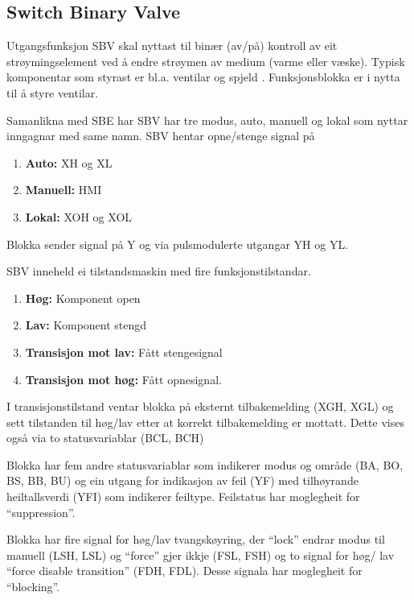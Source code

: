 \subsection{Switch Binary Valve}

Utgangsfunksjon \gls{SBV} skal nyttast til binær (av/på) kontroll av eit strøymingselement ved å endre strøymen av medium (varme eller væske). 
Typisk komponentar som styrast er bl.a. ventilar og spjeld \citep{IEC-63131}.
Funksjonsblokka er i nytta til å styre ventilar.

Samanlikna med \gls{SBE} har \gls{SBV} har tre modus, auto, manuell og lokal som nyttar inngagnar med same namn.
\gls{SBV} hentar opne/stenge signal på
\begin{enumerate}
    \item \textbf{Auto:}        XH og XL  
    \item \textbf{Manuell:}     HMI
    \item \textbf{Lokal:}       XOH og XOL
\end{enumerate}
Blokka sender signal på Y og via pulsmodulerte utgangar YH og YL.

\gls{SBV} inneheld ei tilstandsmaskin med fire funksjonstilstandar. 
\begin{enumerate}
    \item \textbf{Høg:}                 Komponent open
    \item \textbf{Lav:}                 Komponent stengd
    \item \textbf{Transisjon mot lav:}  Fått stengesignal
    \item \textbf{Transisjon mot høg:}  Fått opnesignal.
\end{enumerate}

I transisjonstilstand ventar blokka på eksternt tilbakemelding (XGH, XGL) 
og sett tilstanden til høg/lav etter at korrekt tilbakemelding er mottatt.
Dette vises også via to statusvariablar (BCL, BCH)

Blokka har fem andre statusvariablar som indikerer modus og område (BA, BO, BS, BB, BU) og
ein utgang for indikasjon av feil (YF) med tilhøyrande heiltallsverdi (YFI) som indikerer feiltype. \newline
Feilstatus har moglegheit for ``suppression''.

Blokka har fire signal for høg/lav tvangskøyring, der ``lock'' endrar modus til manuell (LSH, LSL) og ``force'' gjer ikkje (FSL, FSH)
og to signal for høg/ lav ``force disable transition'' (FDH, FDL).
Desse signala har moglegheit for ``blocking''.

